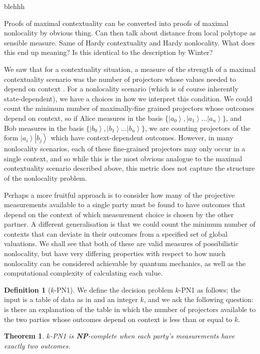 \documentclass{amsart}
\newtheorem{thm}{Theorem}
\theoremstyle{definition}
\newtheorem{defn}{Definition}
\newcommand{\ket}[1]{{\left\vert{#1}\right\rangle}}
\begin{document}
blehhh

Proofs of maximal contextuality can be converted into proofs of maximal nonlocality by obvious thing. Can then talk about distance from local polytope as sensible measure. Same of Hardy contextuality and Hardy nonlocality.
What does this end up meaning? Is this identical to the description by Winter?

We saw that for a contextuality situation, a measure of the strength of a maximal contextuality scenario was the number of projectors whose values needed to depend on context . For a nonlocality scenario (which is of course inherently state-dependent), we have a choices in how we interpret this condition. We could count the minimum number of maximally-fine grained projectors whose outcomes depend on context, so if Alice measures in the basis $\{\ket{a_0},\ket{a_1}\dots\ket{a_n}\}$, and Bob measures in the basis $\{\ket{b_0},\ket{b_1}\dots\ket{b_n}\}$, we are counting projectors of the form $\ket{a_i}\ket{b_j}$ which have context-dependent outcomes. However, in many nonlocality scenarios, each of these fine-grained projectors may only occur in a single context, and so while this is the most obvious analogue to the maximal contextuality scenario described above, this metric does not capture the structure of the nonlocality problem.

Perhaps a more fruitful approach is to consider how many of the projective measurements available to a single party must be found to have outcomes that depend on the context of which measurement choice is chosen by the other partner. A different generalisation is that we could count the minimum number of contexts that can deviate in their outcomes from a specified set of global valuations. We shall see that both of these are valid measures of possibilistic nonlocality, but have very differing properties with respect to how much nonlocality can be considered achievable by quantum mechanics, as well as the computational complexity of calculating each value.

\begin{defn}[$k$-\textsc{PN1}]
We define the decision problem $k$-\textsc{PN1} as follows; the input is a table of data as in \cite{Mans2011} and an integer $k$, and we ask the following question: is there an explanation of the table in which the number of projectors available to the two parties whose outcomes depend on context is less than or equal to $k$.
\end{defn}
\begin{thm}$k$-\textsc{PN1} is \textbf{NP}-complete when each party's measurements have exactly two outcomes.
\end{thm}
\end{document}

